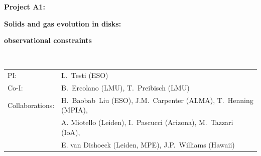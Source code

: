 \documentclass[10pt,fleqn,twoside]{article}
\begin{document}
\newpage


\setcounter{page}{1}

\centerline{\huge\bf\Tcol
%
%
%
%
%
 Project A1: }
\vspace{1em}

\centerline{\LARGE\bf\Tcol Solids and gas evolution in disks:}\vspace{0.3em}
\centerline{\LARGE\bf\Tcol observational constraints}

%
%
%
%
%
\vskip1.0cm


\\
\begin{tabular}{ll}
{\textsf{PI:}}                   & L.~Testi (ESO)\\
{\textsf{Co-I:}}                & B.~Ercolano (LMU), T.~Preibisch (LMU)\\
{\textsf{Collaborations:}}      & H.~Baobab~Liu (ESO),  J.M.~Carpenter (ALMA), T.~Henning (MPIA),\\
                                & A. Miotello (Leiden),  I.~Pascucci (Arizona), M.~Tazzari (IoA),\\
                                & E. van Dishoeck (Leiden, MPE), J.P.~Williams (Hawaii)\\
\end{tabular}

\vspace{1em}
 \\
\end{document}
